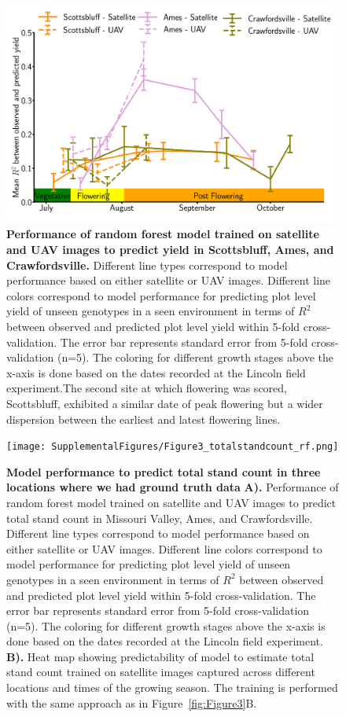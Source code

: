 \documentclass[12pt,twoside]{gsag3jnl}
\begin{document}
\begin{figure}[h!]
\centering
\includegraphics[width=0.98\textwidth]{SupplementalFigures/Figure3A_yield_supplementary.png}
\caption{\textbf{Performance of random forest model trained on satellite and UAV images to predict yield in Scottsbluff, Ames, and Crawfordsville.} Different line types correspond to model performance based on either satellite or UAV images. Different line colors correspond to model performance for predicting plot level yield of unseen genotypes in a seen environment in terms of $R^2$ between observed and predicted plot level yield within 5-fold cross-validation. The error bar represents standard error from 5-fold cross-validation (n=5). The coloring for different growth stages above the x-axis is done based on the dates recorded at the Lincoln field experiment.The second site at which flowering was scored, Scottsbluff, exhibited a similar date of peak flowering but a wider dispersion between the earliest and latest flowering lines.}
\label{fig:modelperformance_supplementary}
\end{figure}

\begin{figure}[h!]
\centering
\texttt{[image: SupplementalFigures/Figure3\_totalstandcount\_rf.png]}
\caption{\textbf{ Model performance to predict total stand count in three locations where we had ground truth data} \textbf{A).} Performance of random forest model trained on satellite and UAV images to predict total stand count in Missouri Valley, Ames, and Crawfordsville. Different line types correspond to model performance based on either satellite or UAV images. Different line colors correspond to model performance for predicting plot level yield of unseen genotypes in a seen environment in terms of $R^2$ between observed and predicted plot level yield within 5-fold cross-validation. The error bar represents standard error from 5-fold cross-validation (n=5). The coloring for different growth stages above the x-axis is done based on the dates recorded at the Lincoln field experiment.
\textbf{B).} Heat map showing predictability of model to estimate total stand count trained on satellite images captured across different locations and times of the growing season. The training is performed with the same approach as in Figure~\ref{fig:Figure3}B.
}
\label{fig:totalstandcount}
\end{figure}
\end{document}
